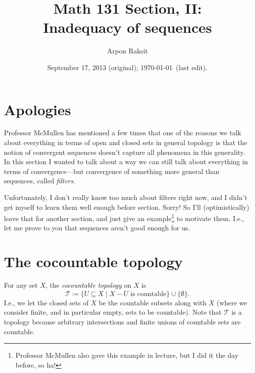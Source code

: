 


\title{Math 131 Section, II:\\Inadequacy of sequences}
\author{Arpon Raksit}
\date{September 17, 2013 (original); \today\ (last edit).}


\maketitle
\thispagestyle{fancy}


\section{Apologies}

Professor McMullen has mentioned a few times that one of the reasons
we talk about everything in terms of open and closed sets in general
topology is that the notion of convergent sequences doesn't capture
all phenomena in this generality. In this section I wanted to talk
about a way we can still talk about everything in terms of
convergence---but convergence of something more general than
sequences, called \textit{filters}.

\medskip
Unfortunately, I don't really know too much about filters right now,
and I didn't get myself to learn them well enough before
section. Sorry! So I'll (optimistically) leave that for another
section, and just give an example\footnote{Professor McMullen also
  gave this example in lecture, but I did it the day before, so ha!}
to motivate them. I.e., let me prove to you that sequences aren't good
enough for us.

\renewcommand{\T}{\mathcal{T}}

\section{The cocountable topology}

\begin{definition}
  For any set $X$, the \textit{cocountable topology} on $X$ is
\[
\T \coloneqq \{U \subseteq X \mid X - U \text{ is countable}\} \cup
\{\emptyset\}.
\]
I.e., we let the closed sets of $X$ be the countable subsets along
with $X$ (where we consider finite, and in particular empty, sets to
be countable). Note that $\T$ is a topology because arbitrary
intersections and finite unions of countable sets are countable.
\end{definition}

